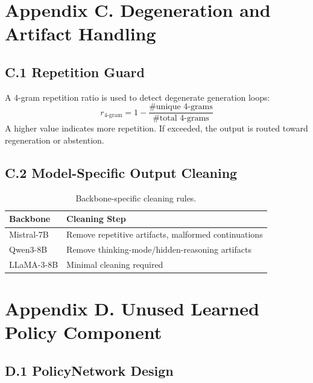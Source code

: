 \section*{Appendix C. Degeneration and Artifact Handling}

\subsection*{C.1 Repetition Guard}

A 4-gram repetition ratio is used to detect degenerate generation loops:
\begin{equation*}
    r_{\text{4-gram}} = 1 - \frac{\text{\# unique 4-grams}}{\text{\# total 4-grams}}
\end{equation*}
A higher value indicates more repetition. If exceeded, the output is routed toward regeneration or abstention.

\subsection*{C.2 Model-Specific Output Cleaning}

\begin{table}[!htb]
\centering
\caption*{Backbone-specific cleaning rules.}
\begin{tabular}{@{}lp{9cm}@{}}
\toprule
\textbf{Backbone} & \textbf{Cleaning Step} \\
\midrule
Mistral-7B & Remove repetitive artifacts, malformed continuations \\
Qwen3-8B & Remove thinking-mode/hidden-reasoning artifacts \\
LLaMA-3-8B & Minimal cleaning required \\
\bottomrule
\end{tabular}
\end{table}

\section*{Appendix D. Unused Learned Policy Component}

\subsection*{D.1 PolicyNetwork Design}

